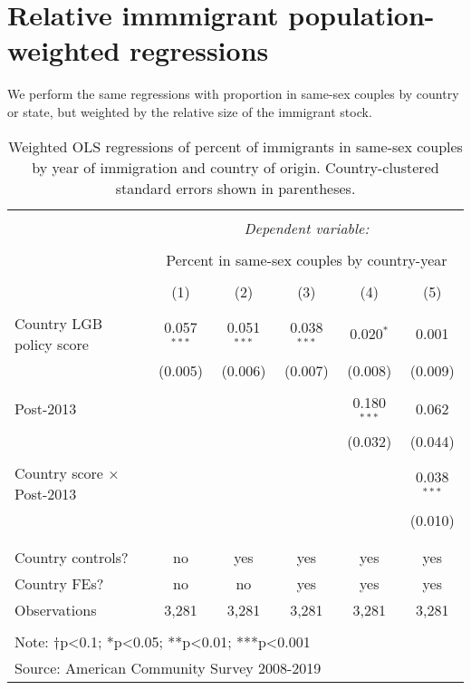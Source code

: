 \documentclass[
  11pt,
]{article}
\begin{document}
\newpage

\hypertarget{relative-immmigrant-population-weighted-regressions}{%
\section{Relative immmigrant population-weighted regressions}\label{relative-immmigrant-population-weighted-regressions}}

We perform the same regressions with proportion in same-sex couples by country or state, but weighted by the relative size of the immigrant stock.

\begin{table}[!htbp] \centering 
  \caption{Weighted OLS regressions of percent of immigrants in same-sex couples by year of immigration and country of origin. Country-clustered standard errors shown in parentheses.} 
  \label{tab:country-props} 
\begin{tabular}{@{\extracolsep{5pt}}lccccc} 
\\[-1.8ex]\hline 
\hline \\[-1.8ex] 
 & \multicolumn{5}{c}{\textit{Dependent variable:}} \\ 
\cline{2-6} 
\\[-1.8ex] & \multicolumn{5}{c}{Percent in same-sex couples by country-year} \\ 
\\[-1.8ex] & (1) & (2) & (3) & (4) & (5)\\ 
\hline \\[-1.8ex] 
 Country LGB policy score & 0.057$^{***}$ & 0.051$^{***}$ & 0.038$^{***}$ & 0.020$^{*}$ & 0.001 \\ 
  & (0.005) & (0.006) & (0.007) & (0.008) & (0.009) \\ 
  & & & & & \\ 
 Post-2013 &  &  &  & 0.180$^{***}$ & 0.062 \\ 
  &  &  &  & (0.032) & (0.044) \\ 
  & & & & & \\ 
 Country score × Post-2013 &  &  &  &  & 0.038$^{***}$ \\ 
  &  &  &  &  & (0.010) \\ 
  & & & & & \\ 
\hline \\[-1.8ex] 
Country controls? & no & yes & yes & yes & yes \\ 
Country FEs? & no & no & yes & yes & yes \\ 
Observations & 3,281 & 3,281 & 3,281 & 3,281 & 3,281 \\ 
\hline 
\hline \\[-1.8ex] 
\multicolumn{6}{l}{Note: †p<0.1; *p<0.05; **p<0.01; ***p<0.001} \\ 
\multicolumn{6}{l}{Source: American Community Survey 2008-2019} \\ 
\end{tabular} 
\end{table}
\end{document}
